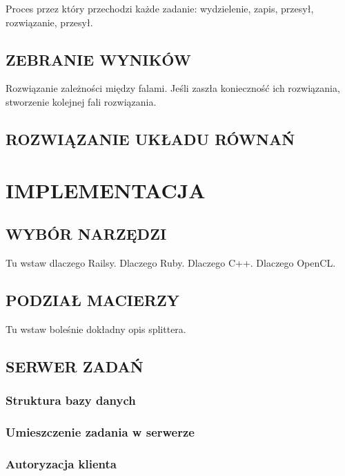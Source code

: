 \documentclass[12pt,a4paper,twoside]{article}
\begin{document}
Proces przez który przechodzi każde zadanie: wydzielenie, zapis, przesył, rozwiązanie, przesył.

\subsection{ZEBRANIE WYNIKÓW}

Rozwiązanie zależności między falami. Jeśli zaszła konieczność ich rozwiązania, stworzenie kolejnej fali rozwiązania.

\subsection{ROZWIĄZANIE UKŁADU RÓWNAŃ}

\section{IMPLEMENTACJA}

\subsection{WYBÓR NARZĘDZI}

Tu wstaw dlaczego Railsy. Dlaczego Ruby. Dlaczego C++. Dlaczego OpenCL.

\subsection{PODZIAŁ MACIERZY}

Tu wstaw boleśnie dokładny opis splittera.


\subsection{SERWER ZADAŃ}

\subsubsection{Struktura bazy danych}

\subsubsection{Umieszczenie zadania w serwerze}

\subsubsection{Autoryzacja klienta}
\end{document}
